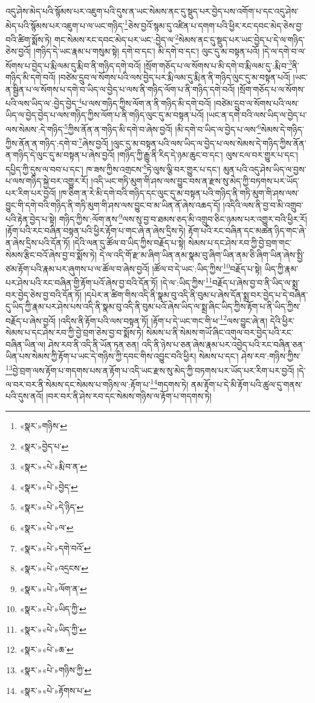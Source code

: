 འདུ་ཤེས་མེད་པའི་སྙོམས་པར་འཇུག་པའི་དུས་ན་ཡང་སེམས་ནང་དུ་སྡུད་པར་བྱེད་པས་འགོག་པ་དང་འདུ་ཤེས་མེད་པའི་སྙོམས་པར་འཇུག་པ་ལ་ཡང་གཉིད་\footnote{«སྣར་»གཉིས་}ཅེས་བྱའོ་སྙམ་དུ་འཛིན་པ་དགག་པའི་ཕྱིར་རང་དབང་མེད་ཅེས་བྱ་བའི་ཚིག་སྨོས་ཏེ། གང་སེམས་རང་དབང་མེད་པར་ཡང་:བྱེད་ལ་\footnote{«སྣར་»བྱེད་པ་}སེམས་ནང་དུ་སྡུད་པར་ཡང་བྱེད་པ་དེ་ལ་གཉིད་ཅེས་བྱའོ། །གཉིད་དེ་ཡང་རྣམ་པ་གསུམ་སྟེ། དགེ་བ་དང་། མི་དགེ་བ་དང་། ལུང་དུ་མ་བསྟན་པའོ། །དེ་ལ་དགེ་བ་ལ་སོགས་པ་བྱེད་པ་རྨི་ལམ་དུ་རྨི་བ་ནི་གཉིད་དགེ་བའོ། །སྲོག་གཅོད་པ་ལ་སོགས་པ་མི་དགེ་བ་རྨི་ལམ་དུ་:རྨི་བ་\footnote{«སྣར་»«པེ་»རྨི་བ་ན་}ནི་གཉིད་མི་དགེ་བའོ། །བཙེམ་དྲུབ་ལ་སོགས་པའི་ལས་བྱེད་པར་རྨི་ལམ་དུ་རྨི་ན་ནི་གཉིད་ལུང་དུ་མ་བསྟན་པའོ། །ཡང་ན་སྦྱིན་པ་ལ་སོགས་པ་དགེ་བ་ཡིད་ལ་བྱེད་པ་ལས་ནི་གཉིད་ལོག་པ་ནི་གཉིད་དགེ་བའོ། །སྲོག་གཅོད་པ་ལ་སོགས་པའི་ལས་ཡིད་ལ་:བྱེད་བྱེད་\footnote{«སྣར་»«པེ་»བྱེད་}པ་ལས་གཉིད་ཀྱིས་ལོག་ན་ནི་གཉིད་མི་དགེ་བའོ། །བཙེམ་དྲུབ་ལ་སོགས་པའི་ལས་ཡིད་ལ་བྱེད་བྱེད་པ་ལས་གཉིད་ཀྱིས་ལོག་པ་ནི་གཉིད་ལུང་དུ་མ་བསྟན་པའོ། །ཡང་ན་དགེ་བའི་ལས་ཡིད་ལ་བྱེད་པ་ལས་སེམས་:དེ་གཉིད་\footnote{«སྣར་»«པེ་»དེ་ཉིད་}ཀྱིས་ནོན་ན་གཉིད་མི་དགེ་བ་ཞེས་བྱའོ། །མི་དགེ་བ་ཡིད་ལ་བྱེད་པ་ལས་\footnote{«སྣར་»«པེ་»ལ་}སེམས་དེ་གཉིད་ཀྱིས་ནོན་ན་གཉིད་:དགེ་བ་\footnote{«སྣར་»«པེ་»དགེ་བའོ་}ཞེས་བྱའོ། །ལུང་དུ་མ་བསྟན་པའི་ལས་ཡིད་ལ་བྱེད་པ་ལས་སེམས་དེ་གཉིད་ཀྱིས་ནོན་ན་གཉིད་དེ་ལུང་དུ་མ་བསྟན་པ་ཞེས་བྱའོ། །གཉིད་ཀྱི་རྒྱུ་ནི་རིད་དེ་ཉམ་ཆུང་བ་དང་། ལུས་ངལ་བར་གྱུར་པ་དང་། དཔྱིད་ཀྱི་དུས་ལ་བབ་པ་དང་། ཁ་ཟས་ཀྱིས་འགྲངས་\footnote{«སྣར་»«པེ་»འདྲངས་}ཏེ་ལུས་ལྕི་བར་གྱུར་པ་དང་། མུན་པའི་འདུ་ཤེས་ཡིད་ལ་བྱས་པ་ལས་གཉིད་སྐྱེ་བར་འགྱུར་རོ། །འདི་ཡང་གཏི་མུག་གི་ཤས་ལས་བྱུང་བས་ན་རྫས་སུ་མེད་ཀྱི་བཏགས་པར་ཡོད་པར་རིག་པར་བྱའོ། །ཁ་ཅིག་ན་རེ་མི་དགེ་བའི་གཉིད་དང་ལུང་དུ་མ་བསྟན་པའི་གཉིད་ནི་གཏི་མུག་གི་ཤས་ལས་བྱུང་གི་དགེ་བའི་གཉིད་ནི་གཏི་མུག་གི་ཤས་ལས་བྱུང་བ་མ་ཡིན་ནོ་ཞེས་འཆད་དོ། །འདིའི་ལས་ནི་བྱ་བ་མི་འགྲུབ་པའི་རྟེན་བྱེད་པ་སྟེ། གཉིད་ཀྱིས་:ལོག་ནས་\footnote{«སྣར་»«པེ་»ལོག་ན་}ལས་སུ་བྱ་བ་ཐམས་ཅད་མི་འགྲུབ་ཅིང་ཉམས་པར་འགྱུར་བའི་ཕྱིར་རོ། །རྟོག་པའི་རང་བཞིན་བསྟན་པའི་ཕྱིར་རྟོག་པ་གང་ཞེ་ན་ཞེས་དྲིས་ཏེ། རྟོག་པའི་རང་བཞིན་དང་མཚན་ཉིད་གང་ཞེ་ན་ཞེས་དྲིས་པའི་དོན་ཏོ། །དེའི་ལན་དུ་ཚོལ་བ་ཡིད་ཀྱིས་བརྗོད་པ་སྟེ། སེམས་པ་དང་ཤེས་རབ་ཀྱི་བྱེ་བྲག་གང་སེམས་རྩིང་བའོ་ཞེས་བྱ་བ་སྨོས་ཏེ། དེ་ལ་འདི་གོ་རྫ་མ་ཞིག་ཡིན་ནམ་སྣམ་བུ་ཞིག་ཡིན་ནམ་ཅི་ཞིག་ཡིན་ཞེས་སྤྱི་ཙམ་རྟོག་པའི་རྣམ་པར་ཞུགས་པ་ལ་ཚོལ་བ་ཞེས་བྱའོ། །ཚོལ་བ་དེ་ཡང་:ཡིད་ཀྱིས་\footnote{«སྣར་»«པེ་»ཡིད་ཀྱི་}བརྗོད་པ་སྟེ། ཡིད་ཀྱི་རྣམ་པར་ཤེས་པའི་རང་བཞིན་གྱི་རྟོག་པའོ་ཞེས་བྱ་བའི་དོན་ཏོ། །དེ་ལ་:ཡིད་ཀྱིས་\footnote{«སྣར་»«པེ་»ཡིད་ཀྱི་}བརྗོད་པ་ཞེས་བྱ་བ་ནི་ཡིད་ལ་སྨྲ་བར་བྱེད་ཅེས་བྱ་བའི་དོན་ཏོ། །དཔེར་ན་ཚིག་གིས་འདི་ནི་སྣམ་བུ་འདི་ནི་བུམ་པ་ཞེས་དོན་སྨྲ་བར་བྱེད་པ་དེ་བཞིན་དུ་ཡིད་ཀྱི་རྣམ་པར་ཤེས་པས་འདི་ནི་སྣམ་བུ་འདི་ནི་བུམ་པའོ་ཞེས་ཡིད་ལ་སྨྲ་ཞིང་ཡིད་ཀྱིས་རྟོག་པ་ནི་ཡིད་ཀྱིས་བརྗོད་པ་ཞེས་བྱའོ། །འདིས་ནི་རྟོག་པའི་ལས་བསྟན་ཏོ། །རྟོག་པ་དེ་ཡང་གང་གི་ཕ་\footnote{«སྣར་»«པེ་»ཆ་}ལས་བྱུང་ཞེ་ན། དེའི་ཕྱིར་སེམས་པ་དང་ཤེས་རབ་ཀྱི་བྱེ་བྲག་ཅེས་བྱ་བ་སྨོས་ཏེ། སེམས་པ་ནི་སེམས་གཡོ་ཞིང་འགུལ་བར་བྱེད་པའི་རང་བཞིན་ཡིན་ལ། ཤེས་རབ་ནི་འདི་ནི་ཡོན་ཏན་ཅན། འདི་ནི་ཉེས་པ་ཅན་ཞེས་རྣམ་པར་འབྱེད་པའི་རང་བཞིན་ཅན་ཡིན་པས་སེམས་ཀྱི་རྟོག་པ་ཡང་དེ་གཉིས་ཀྱི་དབང་གིས་འབྱུང་བའི་ཕྱིར། སེམས་པ་དང་། ཤེས་རབ་:གཉིས་ཀྱིས་\footnote{«སྣར་»«པེ་»གཉིས་ཀྱི་}བྱེ་བྲག་ལས་རྟོག་པ་གདགས་པས་ན་རྟོག་པ་འདི་ཡང་རྫས་སུ་མེད་ཀྱི་བཏགས་པར་ཡོད་པར་རིག་པར་བྱའོ། །དེ་ལ་བར་བར་ནི་སེམས་དང་སེམས་པ་གཉིས་ལ་:རྟོག་པ་\footnote{«སྣར་»«པེ་»རྟོགས་པ་}གདགས་ཏེ། ནམ་རྟོག་པ་དེ་མི་རྟོག་པའི་ཚུལ་དུ་གནས་པའི་དུས་ནའོ། །བར་བར་ནི་ཤེས་རབ་དང་སེམས་གཉིས་ལ་རྟོག་པ་གདགས་ཏེ། 